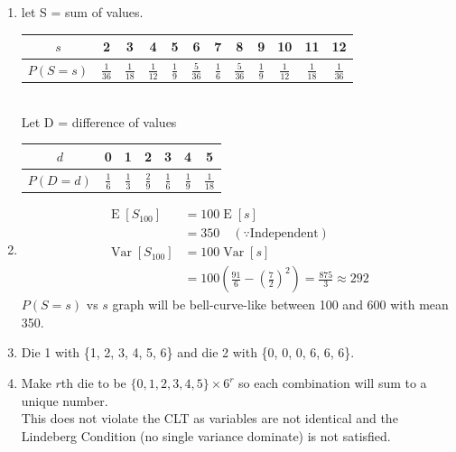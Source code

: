 \documentclass[12pt, a4paper]{article}
\begin{document}
\begin{sol}
\begin{enumerate}
\item[(a)] let S = sum of values. \\[1em]
\begin{tabular}{|c|ccccccccccc|}
    \hline
    $s$ & 2 & 3 & 4 & 5 & 6 & 7 & 8 & 9 & 10 & 11 & 12 \\
    \hline
    $P(S=s)$ & $\frac{1}{36}$ & $\frac{1}{18}$ & $\frac{1}{12}$ & $\frac{1}{9}$ & $\frac{5}{36}$ & $\frac{1}{6}$ & $\frac{5}{36}$ & $\frac{1}{9}$ & $\frac{1}{12}$ & $\frac{1}{18}$ & $\frac{1}{36}$ \\
    \hline
\end{tabular} \\

Let D = difference of values \\[1em]
\begin{tabular}{|c|cccccc|}
    \hline
    $d$ & 0 & 1 & 2 & 3 & 4 & 5 \\
    \hline
    $P(D=d)$ & $\frac{1}{6}$ & $\frac{1}{3}$ & $\frac{2}{9}$ & $\frac{1}{6}$ & $\frac{1}{9}$ & $\frac{1}{18}$ \\
    \hline
\end{tabular}
\item[(b)] 
\begin{align*}
    \operatorname{E}[S_{100}] &= 100 \operatorname{E}[s] \\
    &= 350 \quad (\because \text{Independent})  \\
    \operatorname{Var}[S_{100}] &= 100\operatorname{Var}[s] \\
    &= 100 \left(\frac{91}{6} - \left(\frac{7}{2}\right)^2\right) = \frac{875}{3} \approx 292
\end{align*}
$P(S=s)$ vs $s$ graph will be bell-curve-like between 100 and 600 with mean 350.
\item[(c)] Die 1 with \{1, 2, 3, 4, 5, 6\} and die 2 with \{0, 0, 0, 6, 6, 6\}.
\item[(d)] Make $r$th die to be $\{0, 1, 2, 3, 4, 5\} \times 6^r$ so each combination will sum to a unique number. \\
This does not violate the CLT as variables are not identical and the Lindeberg Condition (no single variance dominate) is not satisfied.
\end{enumerate}
\end{sol}
\bigskip
\end{document}
